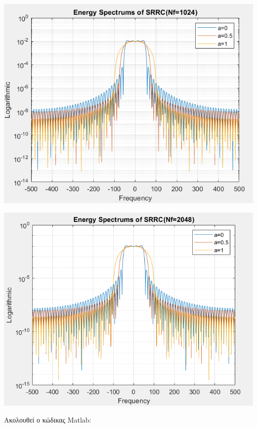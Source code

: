 \begin{minipage}[t]{0.49\textwidth}
    \includegraphics[width=\textwidth]{ALPHA/Images/A1.sem.1024.png}
\end{minipage}
\hfill
\begin{minipage}[t]{0.5\textwidth}
    \includegraphics[width=\textwidth]{ALPHA/Images/A1.sem.2048.png}
\end{minipage}

\begin{justify}
    Ακολουθεί ο κώδικας \textlatin{Matlab}:
\end{justify}

\vspace{-0.5cm}

